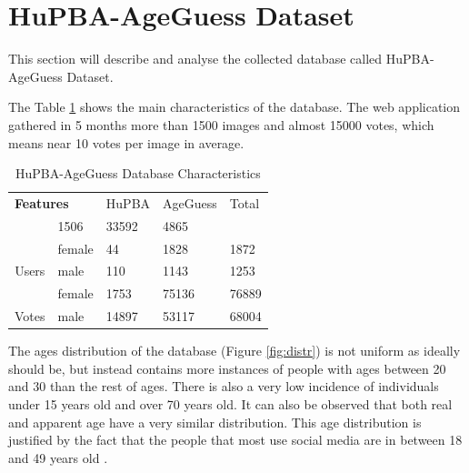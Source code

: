 \section{HuPBA-AgeGuess Dataset}

This section will describe and analyse the collected database called HuPBA-AgeGuess Dataset.  

The Table \ref{tab:charact} shows the main characteristics of the database. The web application gathered in 5 months more than 1500 images and almost 15000 votes, which means near 10 votes per image in average.  

\begin{table}[h]
	\centering
	\begin{tabular}{|c|l||l|l|l|}
		\hline
		\multicolumn{2}{|l||}{\textbf{Features}} & HuPBA & AgeGuess & Total \\ \hhline{==#===}
		\multicolumn{2}{|l||}{Images}                                    & 1506  & 33592 & 4865\\ \hline
		& female                & 44  & 1828 & 1872  \\ \cline{2-3} 
		\multirow{-2}{*}{Users}                 & male                  & 110 & 1143 & 1253 \\ \hline
		& female                & 1753  & 75136 & 76889\\ \cline{2-3} 
		\multirow{-2}{*}{Votes}                 & male                  & 14897 & 53117 & 68004\\ \hline
	\end{tabular}
	\caption{HuPBA-AgeGuess Database Characteristics}
	\label{tab:charact}
\end{table}
	
The ages distribution of the database (Figure \ref{fig:distr}) is not uniform as ideally should be, but instead contains more instances of people with ages between 20 and 30 than the rest of ages. There is also a very low incidence of individuals under 15 years old and over 70 years old. It can also be observed that both real and apparent age have a very similar distribution. This age distribution is justified by the fact that the people that most use social media are in between 18 and 49 years old \cite{brenner201372}.

